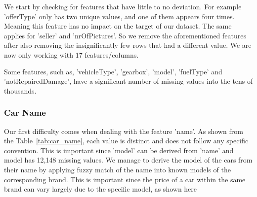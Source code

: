 \documentclass[conference]{IEEEtran}
\begin{document}
We start by checking for features that have little to no deviation. For example
'offerType' only has two unique values, and one of them appears four times.
Meaning this feature has no impact on the target of our dataset. The same
applies for 'seller' and 'nrOfPictures'. So we remove the aforementioned
features after also removing the insignificantly few rows that had a different
value. We are now only working with 17 features/columns.

Some features, such as, 'vehicleType', 'gearbox', 'model', 'fuelType' and
'notRepairedDamage', have a significant number of missing values into the tens
of thousands.

\subsubsection{Car Name}

\begin{table}[H]
\centering
{}
\caption{Sample of car name, model, and brand from dataset}
\label{tab:car_name}
\end{table}

Our first difficulty comes when dealing with the feature 'name'. As shown from
the Table~\ref{tab:car_name}, each value is distinct and does not follow any
specific convention. This is important since 'model' can be derived from 'name'
and model has 12,148 missing values. We manage to derive the model of the cars
from their name by applying fuzzy match of the name into known models of the
corresponding brand. This is important since the price of a car within the same
brand can vary largely due to the specific model, as shown here 
\end{document}
